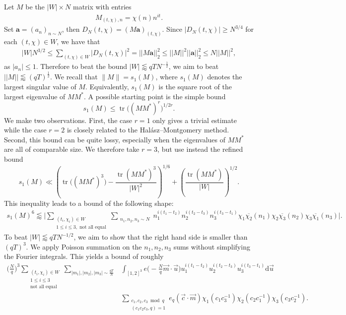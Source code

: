 \documentclass[12pt]{amsart}
\theoremstyle{definition}
\theoremstyle{plain}
\theoremstyle{remark}
\numberwithin{equation}{section}
\numberwithin{theorem}{section}
\numberwithin{equation}{section}
\begin{document}
	Let $M$ be the $|W| \times N$ matrix with entries 
	\begin{align*}
		M_{(t, \chi),n} = \chi(n)n^{it}.
	\end{align*}
	Set $\textbf{a}=(a_n)_{n\sim N}$, then $D_N(t,\chi) = (M\textbf{a})_{(t, \chi)}$. Since $|D_N(t,\chi)| \geq N^{3/4}$ for each $(t,\chi) \in W$, we have that
	\begin{align*}
		|W| N^{3/2} \leq \sum_{(t,\chi) \in W} |D_N(t,\chi)|^2 =||M\textbf{a}||_2^2 \leq ||M||^2 ||\textbf{a}||_2^2  \leq N||M||^2,
	\end{align*}
	as $|a_n| \leq 1$. Therefore to beat the bound $|W| \lessapprox qTN^{-\frac{1}{2}}$, we aim to beat $||M|| \lessapprox (qT)^{\frac{1}{2}}$. We recall that $\|M\|=s_1(M)$, where $s_1(M)$ denotes the largest singular value of $M$. Equivalently, $s_1(M)$ is the square root of the largest eigenvalue of $MM^*$. A possible starting point is the simple bound
	\[
	s_1(M)\leq \operatorname{tr}\bigl((MM^*)^r\bigr)^{1/2r}.
	\]
	We make two observations. First, the case $r=1$ only gives a trivial
	estimate while the case $r=2$ is closely related to the Halász--Montgomery
	method. Second, this bound can be quite lossy, especially when the eigenvalues
	of $MM^*$ are all of comparable size. We therefore take $r=3$, but use instead
	the refined bound
	\[
	s_1(M)
	\ll
	\left(
	\operatorname{tr}\bigl((MM^*)^3\bigr)
	-
	\frac{\operatorname{tr}(MM^*)^3}{|W|^2}
	\right)^{1/6}
	+
	\left(
	\frac{\operatorname{tr}(MM^*)}{|W|}
	\right)^{1/2}.
	\]
	This inequality leads to a bound of the following shape:
	\begin{align*}
		s_1(M)^6 \lessapprox \bigg|\sum_{\substack{(t_i,\chi_i) \in W \\ 1 \leq i \leq 3 , \text{ not all equal}}} \sum_{\substack{n_1,n_2,n_3 \sim N}} n_1^{i(t_1-t_2)}n_2^{i(t_2-t_3)}n_3^{i(t_3-t_1)} {\chi_1 \overline{\chi_2}}(n_1) 
		{\chi_2 \overline{\chi_3}}(n_2) 
		{\chi_3 \overline{\chi_1}}(n_3)\bigg|.
	\end{align*}
	To beat $|W| \lessapprox qTN^{-1/{2}}$, we aim to show that the right hand side is smaller than $(qT)^3$. We apply Poisson summation on the $n_1,n_2,n_3$ sums without simplifying the Fourier integrals. This yields a bound of roughly
	\begin{align*}      \bigg({\frac{N}{q}}\bigg)^3\sum_{\substack{(t_i,\chi_i) \in W \\ 1 \leq i \leq 3 \\  \text{not all equal}}}\sum_{|m_1|,|m_2|,|m_3| \sim \frac{qT}{N}}&\int_{[1,2]^3} e\bigg(-\frac{N}{q} \overrightarrow{m}\cdot \overrightarrow{u}\bigg)  u_1^{i(t_1-t_2)}u_2^{i(t_2-t_3)}u_3^{i(t_3-t_1)} \mathrm{d}\overrightarrow{u} \\ &\sum_{\substack{c_1,c_2,c_3 \bmod{q} \\ (c_1c_2c_3,q)=1}} e_q(\overrightarrow{c} \cdot \overrightarrow{m}) \chi_1(c_1c_3^{-1}) \chi_2 (c_2c_1^{-1})\chi_3(c_3c_2^{-1}) .
	\end{align*}
\end{document}
